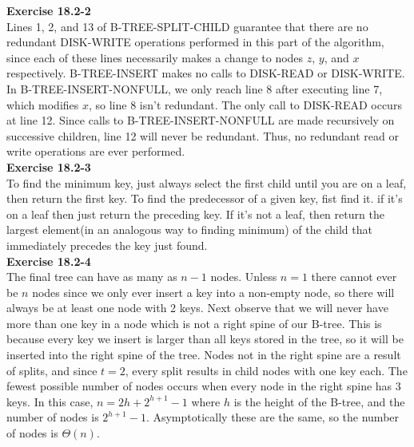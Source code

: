 \documentclass{article}
\begin{document}


\noindent\textbf{Exercise 18.2-2}\\

Lines 1, 2, and 13 of B-TREE-SPLIT-CHILD guarantee that there are no redundant DISK-WRITE operations performed in this part of the algorithm, since each of these lines necessarily makes a change to nodes $z$, $y$, and $x$ respectively.  B-TREE-INSERT makes no calls to DISK-READ or DISK-WRITE.  In B-TREE-INSERT-NONFULL, we only reach line 8 after executing line 7, which modifies $x$, so line 8 isn't redundant.  The only call to DISK-READ occurs at line 12.  Since calls to B-TREE-INSERT-NONFULL are made recursively on successive children, line 12 will never be redundant.  Thus, no redundant read or write operations are ever performed.\\

\noindent\textbf{Exercise 18.2-3}\\

To find the minimum key, just always select the first child until you are on a leaf, then return the first key. To find the predecessor of a given key, fist find it. if it's on a leaf then just return the preceding key. If it's not a leaf, then return the largest element(in an analogous way to finding minimum) of the child that immediately precedes the key just found.\\ 

\noindent\textbf{Exercise 18.2-4}\\

The final tree can have as many as $n-1$ nodes. Unless $n=1$ there cannot ever be $n$ nodes since we only ever insert a key into a non-empty node, so there will always be at least one node with 2 keys.  Next observe that we will never have more than one key in a node which is not a right spine of our B-tree.  This is because every key we insert is larger than all keys stored in the tree, so it will be inserted into the right spine of the tree.  Nodes not in the right spine are a result of splits, and since $t=2$, every split results in child nodes with one key each. The fewest possible number of nodes occurs when every node in the right spine has 3 keys.  In this case, $n=2h + 2^{h+1}-1$ where $h$ is the height of the B-tree, and the number of nodes is $2^{h+1}-1$.  Asymptotically these are the same, so the number of nodes is $\Theta(n)$.\\
\end{document}
